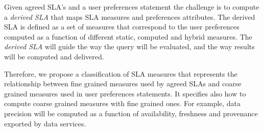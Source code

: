 Given agreed SLA's and a user preferences statement the challenge is to compute a  {\em derived SLA} that  maps SLA measures and preferences attributes.  The derived SLA is defined as a set of measures that correspond to the user preferences computed as a function of different static, computed and hybrid measures. The {\em derived SLA}  will guide the way the query will be evaluated, and the way results will be computed and delivered.

 
Therefore, we propose a classification of SLA measures that represents the relationship between fine grained measures used by agreed SLAs and coarse grained measures used in user preferences statements. It specifies also how to compute coarse grained measures with fine grained ones. For example, data precision will be computed as a function of availability, freshness and provenance exported by data services. 


